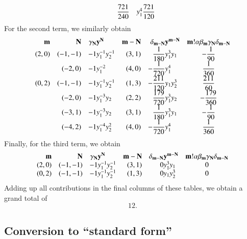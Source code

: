 \begin{example}
{$$\begin{array}{rrr@{}lrr@{}lc}
		& \displaystyle\frac{721}{240} & y_1^4
		& \displaystyle\frac{721}{120}
\end{array}
$$
}%
For the second term, we similarly obtain
{\renewcommand\arraystretch{2}
$$
\begin{array}{rrr@{}lrr@{}lc}
\vec m & \vec N & \gamma_{\vec N} & \vec y^{\vec N} &
\vec m - \vec N & \delta_{\vec m - \vec N} & \vec y^{\vec m - \vec N} &
\vec m! \alpha \beta_{\vec m} \gamma_{\vec N} \delta_{\vec m - \vec N}
\\
(2,0) & (-1,-1) & -1 & y_1^{-1} y_2^{-1} & (3,1)
		& \displaystyle\frac{1}{180} & y_1^3 y_1
		& \displaystyle-\frac{1}{90}
\\
      & (-2,0) & -1 & y_1^{-2} & (4,0)
		& \displaystyle-\frac{1}{720} & y_1^4
		& \displaystyle\frac{1}{360}
\\
(0,2) & (-1,-1) & -1 & y_1^{-1} y_2^{-1} & (1,3)
		& \displaystyle-\frac{211}{120} & y_1 y_2^3
		& \displaystyle\frac{211}{60}
\\
      & (-2,0) & -1 & y_1^{-3} y_2 & (2,2)
		& \displaystyle\frac{179}{720} & y_1^3 y_2
		& \displaystyle-\frac{179}{360}
\\
      & (-3,1) & -1 & y_1^{-3} y_2 & (3,1)
		& \displaystyle\frac{1}{180} & y_1^3 y_1
		& \displaystyle-\frac{1}{90}
\\
      & (-4,2) & -1 & y_1^{-4} y_2^2 & (4,0)
		& \displaystyle-\frac{1}{720} & y_1^4
		& \displaystyle\frac{1}{360}
\end{array}
$$
}%
Finally, for the third term, we obtain
$$
\begin{array}{rrr@{}lrr@{}lc}
\vec m & \vec N & \gamma_{\vec N} & \vec y^{\vec N} &
\vec m - \vec N & \delta_{\vec m - \vec N} & \vec y^{\vec m - \vec N} &
\vec m! \alpha \beta_{\vec m} \gamma_{\vec N} \delta_{\vec m - \vec N}
\\
(2,0) & (-1,-1) & -1 & y_1^{-1} y_2^{-1} & (3,1)
		& 0 & y_1^3 y_1
		& 0
\\
(0,2) & (-1,-1) & -1 & y_1^{-1} y_2^{-1} & (1,3)
		& 0 & y_1 y_2^3
		& 0
\end{array}
$$
Adding up all contributions in the final columns of these tables,
we obtain a grand total of
$$
12.
$$
\end{example}

\subsection{Conversion to ``standard form''}
\label{s:standard}

